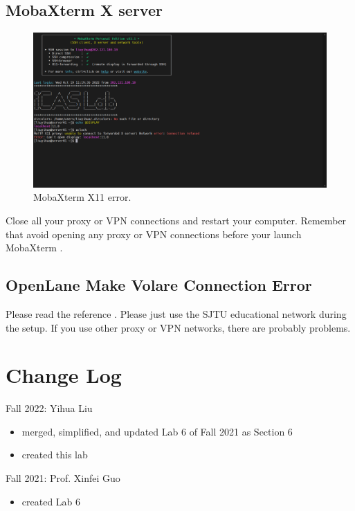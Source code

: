 \documentclass[a4paper,12pt,twoside]{article}
\begin{document}
\subsection{MobaXterm X server}\label{AMobaX}
\begin{figure}[H]
    \centering
    \includegraphics[width=\textwidth]{images/13.png}
    \caption{MobaXterm X11 error.}
\end{figure}
Close all your proxy or VPN connections and restart your computer. Remember that avoid opening any proxy or VPN connections before your launch MobaXterm \cite{uppmax}.
\subsection{OpenLane Make Volare Connection Error}\label{ATVolare}
Please read the reference \cite{volare}. Please just use the SJTU educational network during the setup. If you use other proxy or VPN networks, there are probably problems.

\section{Change Log}
Fall 2022: Yihua Liu
\begin{itemize}
    \item merged, simplified, and updated Lab 6 of Fall 2021 as Section 6
    \item created this lab
\end{itemize}
Fall 2021: Prof. Xinfei Guo
\begin{itemize}
    \item created Lab 6
\end{itemize}

\printbibliography
\end{document}
